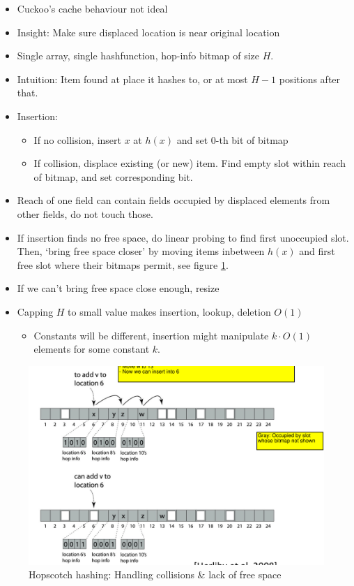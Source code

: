 \documentclass[a4paper]{scrreprt}
\begin{document}
\begin{itemize}
		\item Cuckoo's cache behaviour not ideal
		\item Insight: Make sure displaced location is near original location
		\item Single array, single hashfunction, hop-info bitmap of size $H$.
		\item Intuition: Item found at place it hashes to, or at most $H-1$
				positions after that.
		\item Insertion:
				\begin{itemize}
						\item If no collision, insert $x$ at $h(x)$ and set 0-th bit of bitmap
						\item If collision, displace existing (or new) item.
								Find empty slot within reach of bitmap, and set
								corresponding bit.
				\end{itemize}
		\item Reach of one field can contain fields occupied by displaced
				elements from other fields, do not touch those.
		\item If insertion finds no free space, do linear probing to find first
				unoccupied slot. Then, `bring free space closer' by moving
				items inbetween $h(x)$ and first free slot where their bitmaps
				permit, see figure \ref{img:hopscotch}.
		\item If we can't bring free space close enough, resize
		\item Capping $H$ to small value makes insertion, lookup, deletion $O(1)$
				\begin{itemize}
						\item Constants will be different, insertion might
								manipulate $k \cdot O(1)$ elements for some
								constant $k$.
				\end{itemize}
\end{itemize}

\begin{figure}
		\centering
		\includegraphics[width=\textwidth]{resources/07_hopscotch}
		\caption{Hopscotch hashing: Handling collisions \& lack of free space}
		\label{img:hopscotch}
\end{figure}
\end{document}
